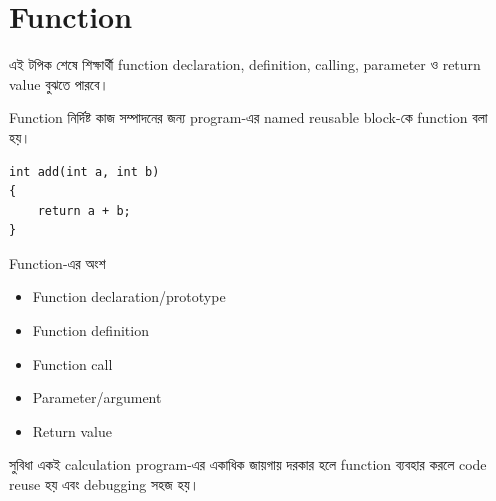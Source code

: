 \section{Function}

\begin{learningbox}
এই টপিক শেষে শিক্ষার্থী function declaration, definition, calling, parameter ও return value বুঝতে পারবে।
\end{learningbox}

\begin{definitionbox}{Function}
নির্দিষ্ট কাজ সম্পাদনের জন্য program-এর named reusable block-কে function বলা হয়।
\end{definitionbox}

\begin{verbatim}
int add(int a, int b)
{
    return a + b;
}
\end{verbatim}

\begin{keypointbox}{Function-এর অংশ}
\begin{itemize}
\item Function declaration/prototype
\item Function definition
\item Function call
\item Parameter/argument
\item Return value
\end{itemize}
\end{keypointbox}

\begin{examplebox}{সুবিধা}
একই calculation program-এর একাধিক জায়গায় দরকার হলে function ব্যবহার করলে code reuse হয় এবং debugging সহজ হয়।
\end{examplebox}
